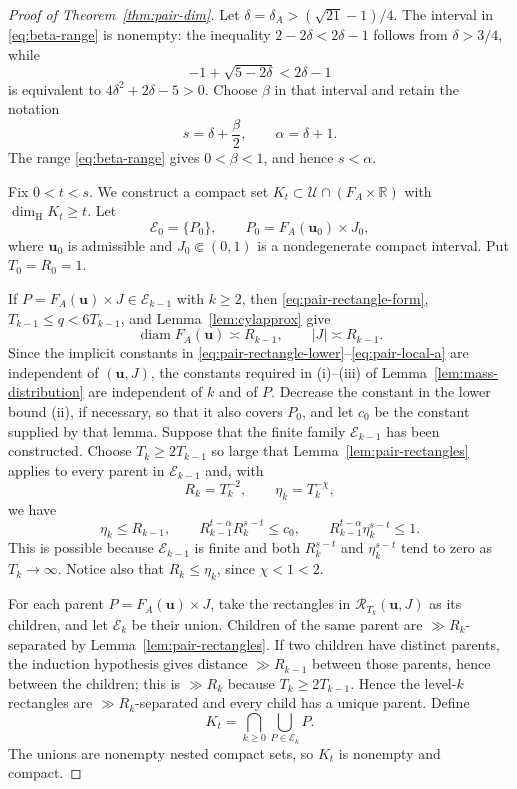 \documentclass[11pt]{amsart}
\newcommand{\R}{\mathbb R}
\newcommand{\diam}{\operatorname{diam}}
\newcommand{\dimH}{\dim_{\mathrm H}}
\begin{document}
\begin{proof}[Proof of Theorem~\ref{thm:pair-dim}]
Let $\delta=\delta_A>(\sqrt{21}-1)/4$.  The interval in
\eqref{eq:beta-range} is nonempty: the inequality
$2-2\delta<2\delta-1$ follows from $\delta>3/4$, while
$$
 -1+\sqrt{5-2\delta}<2\delta-1
$$
is equivalent to $4\delta^2+2\delta-5>0$.  Choose $\beta$ in that
interval and retain the notation
$$
 s=\delta+\frac\beta2,\qquad \alpha=\delta+1.
$$
The range \eqref{eq:beta-range} gives $0<\beta<1$, and hence $s<\alpha$.

Fix $0<t<s$.  We construct a compact set
$K_t\subset \mathcal U\cap(F_A\times\R)$ with $\dimH K_t\ge t$.
Let
$$
 \mathcal E_0=\{P_0\},\qquad P_0=F_A(\mathbf{u}_0)\times J_0,
$$
where $\mathbf{u}_0$ is admissible and $J_0\Subset(0,1)$ is a nondegenerate compact
interval.  Put $T_0=R_0=1$.

If $P=F_A(\mathbf{u})\times J\in\mathcal E_{k-1}$ with $k\ge2$, then
\eqref{eq:pair-rectangle-form}, $T_{k-1}\le q<6T_{k-1}$, and
Lemma~\ref{lem:cylapprox} give
$$
 \diam F_A(\mathbf{u})\asymp R_{k-1},\qquad |J|\asymp R_{k-1}.
$$
Since the implicit constants in
\eqref{eq:pair-rectangle-lower}--\eqref{eq:pair-local-a} are independent of
$(\mathbf{u},J)$, the constants required in \textup{(i)}--\textup{(iii)} of
Lemma~\ref{lem:mass-distribution} are independent of $k$ and of $P$.  Decrease
the constant in the lower bound \textup{(ii)}, if necessary, so that it also
covers $P_0$, and let $c_0$ be the constant supplied by that lemma.  Suppose that the
finite family $\mathcal E_{k-1}$ has been constructed.  Choose
$T_k\ge2T_{k-1}$ so large that Lemma~\ref{lem:pair-rectangles} applies to every
parent in $\mathcal E_{k-1}$ and, with
$$
 R_k=T_k^{-2},\qquad \eta_k=T_k^{-\chi},
$$
we have
\begin{equation}\label{eq:pair-parameter-choice}
 \eta_k\le R_{k-1},\qquad
 R_{k-1}^{t-\alpha}R_k^{s-t}\le c_0,
 \qquad
 R_{k-1}^{t-\alpha}\eta_k^{s-t}\le1.
\end{equation}
This is possible because $\mathcal E_{k-1}$ is finite and both
$R_k^{s-t}$ and $\eta_k^{s-t}$ tend to zero as $T_k\to\infty$.  Notice also
that $R_k\le\eta_k$, since $\chi<1<2$.

For each parent $P=F_A(\mathbf{u})\times J$, take the rectangles in
$\mathcal R_{T_k}(\mathbf{u},J)$ as its children, and let $\mathcal E_k$ be their
union.  Children of the same parent are $\gg R_k$-separated by
Lemma~\ref{lem:pair-rectangles}.  If two children have distinct parents, the induction hypothesis gives
distance $\gg R_{k-1}$ between those parents, hence between the children; this
is $\gg R_k$ because $T_k\ge2T_{k-1}$.  Hence the level-$k$ rectangles are
$\gg R_k$-separated and every child has a unique parent.  Define
\begin{equation}\label{eq:pair-cantor-set}
 K_t=\bigcap_{k\ge0}\bigcup_{P\in\mathcal E_k}P.
\end{equation}
The unions are nonempty nested compact sets, so $K_t$ is nonempty and compact.


\end{proof}
\end{document}
